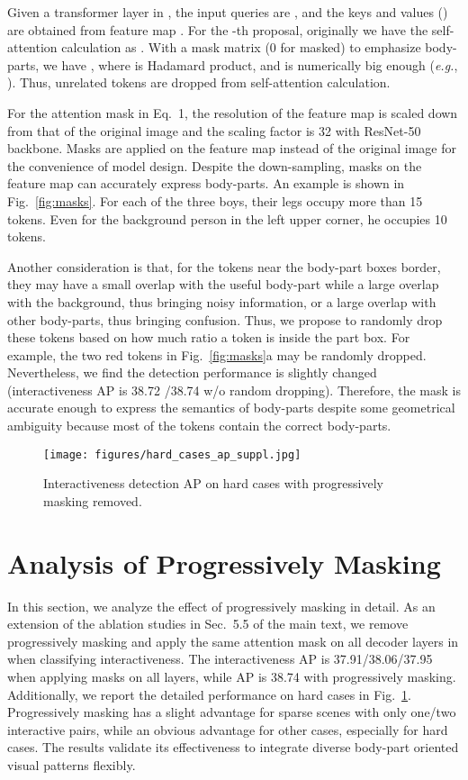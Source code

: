\documentclass[runningheads]{llncs}
\begin{document}
Given a transformer layer in , the input queries are , and the keys and values  () are obtained from feature map . For the -th proposal, originally we have the self-attention calculation as . With a mask matrix (0 for masked) to emphasize body-parts, 
we have , where 
 is Hadamard product,
 and  is numerically big enough (\textit{e.g.}, ). Thus, unrelated tokens are dropped from self-attention calculation.

For the attention mask in Eq.~1, the resolution of the feature map  is scaled down from that of the original image and the scaling factor is 32 with ResNet-50 backbone. Masks are applied on the feature map instead of the original image for the convenience of model design. 
Despite the down-sampling, masks on the feature map can accurately express body-parts. An example is shown in Fig.~\ref{fig:masks}. For each of the three boys, their legs occupy more than 15 tokens. Even for the background person in the left upper corner, he occupies 10 tokens.

Another consideration is that, for the tokens near the body-part boxes border, they may have a small overlap with the useful body-part while a large overlap with the background, thus bringing noisy information, or a large overlap with other body-parts, thus bringing confusion. 
Thus, we propose to randomly drop these tokens based on how much ratio a token is inside the part box. For example, the two red tokens in Fig.~\ref{fig:masks}a may be randomly dropped. Nevertheless, we find the detection performance is slightly changed (interactiveness AP is 38.72 /38.74 w/o random dropping). Therefore, the mask is accurate enough to express the semantics of body-parts despite some geometrical ambiguity because most of the tokens contain the correct body-parts.

\begin{figure}
\centering
\texttt{[image: figures/hard\_cases\_ap\_suppl.jpg]}
\caption{Interactiveness detection AP on hard cases with progressively masking removed.}
\label{fig:suppl_ap}
\end{figure}

\section{Analysis of Progressively Masking}
In this section, we analyze the effect of progressively masking in detail. 
As an extension of the ablation studies in Sec.~5.5 of the main text, we remove progressively masking and apply the same attention mask on all decoder layers in  when classifying interactiveness. The interactiveness AP is 37.91/38.06/37.95 when applying masks  on all layers, while AP is 38.74 with progressively masking. Additionally, we report the detailed performance on hard cases in Fig.~\ref{fig:suppl_ap}. Progressively masking has a slight advantage for sparse scenes with only one/two interactive pairs, while an obvious advantage for other cases, especially for hard cases. The results validate its effectiveness to integrate diverse body-part oriented visual patterns flexibly.
\end{document}
